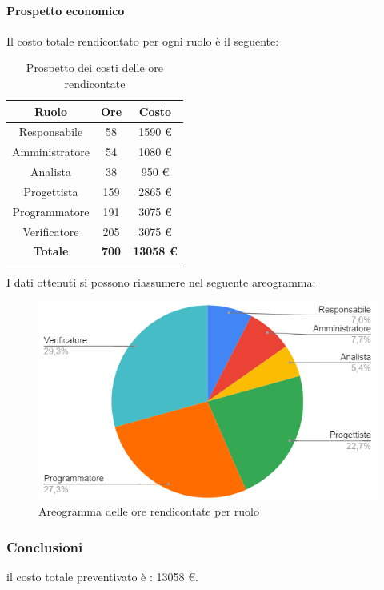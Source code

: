 \paragraph{Prospetto economico}
Il costo totale rendicontato per ogni ruolo è il seguente:
\begin{table}[H]
		\begin{center}
			\setlength{\aboverulesep}{0pt}
			\setlength{\belowrulesep}{0pt}
			\setlength{\extrarowheight}{.75ex}
			\begin{tabular}{ c c c }
				\rowcolor{AzzurroGruppo!30} 
				\textbf{Ruolo} & \textbf{Ore} & \textbf{Costo} \\
				\toprule
				Responsabile   & 58 & 1590 \euro \\
				Amministratore & 54 & 1080 \euro \\
				Analista       & 38 & 950 \euro \\
				Progettista    & 159 & 2865 \euro \\
				Programmatore  & 191 & 3075 \euro \\
				Verificatore   & 205 & 3075 \euro \\
				\textbf{Totale} & \textbf{700} & \textbf{13058 \euro} \\
				\bottomrule
			\end{tabular}
			\caption{Prospetto dei costi delle ore rendicontate}
		\end{center}
	\end{table}
I dati ottenuti si possono riassumere nel seguente areogramma:
\begin{figure}[H]
    \centering
    \includegraphics[scale = 0.5]{components/img/rendiconto_torta.png}
    \caption{Areogramma delle ore rendicontate per ruolo}
    \label{fig:Areogramma ripartizione ore totali rendicontate}
\end{figure}
\subsubsection{Conclusioni}
il costo totale preventivato è : 13058 \euro .